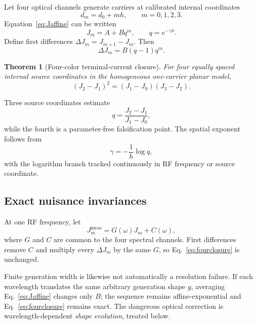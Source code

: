 \documentclass[11pt]{article}
\newtheorem{theorem}{Theorem}
\begin{document}
Let four optical channels generate carriers at calibrated internal coordinates
\begin{equation}
d_m=d_0+mh,
\qquad m=0,1,2,3.
\label{eq:fourcoords}
\end{equation}
Equation~\eqref{eq:Jaffine} can be written
\begin{equation}
J_m=A+Bq^m,
\qquad q=e^{-\gamma h}.
\label{eq:affineseq}
\end{equation}
Define first differences $\Delta J_m=J_{m+1}-J_m$. Then
\begin{equation}
\Delta J_m=B(q-1)q^m.
\label{eq:firstdiff}
\end{equation}

\begin{theorem}[Four-color terminal-current closure]
For four equally spaced internal source coordinates in the homogeneous one-carrier planar model,
\begin{equation}
\boxed{(J_2-J_1)^2=(J_1-J_0)(J_3-J_2).}
\label{eq:fourclosure}
\end{equation}
\end{theorem}

Three source coordinates estimate
\begin{equation}
\boxed{q=\frac{J_2-J_1}{J_1-J_0},}
\label{eq:qrecover}
\end{equation}
while the fourth is a parameter-free falsification point. The spatial exponent follows from
\begin{equation}
\boxed{\gamma=-\frac{1}{h}\log q,}
\label{eq:grecover}
\end{equation}
with the logarithm branch tracked continuously in RF frequency or source coordinate.

\subsection{Exact nuisance invariances}

At one RF frequency, let
\begin{equation}
J_m^{\mathrm{meas}}=G(\omega)J_m+C(\omega),
\end{equation}
where $G$ and $C$ are common to the four spectral channels. First differences remove $C$ and multiply every $\Delta J_m$ by the same $G$, so Eq.~\eqref{eq:fourclosure} is unchanged.

Finite generation width is likewise not automatically a resolution failure. If each wavelength translates the same arbitrary generation shape $g$, averaging Eq.~\eqref{eq:Jaffine} changes only $B$; the sequence remains affine-exponential and Eq.~\eqref{eq:fourclosure} remains exact. The dangerous optical correction is wavelength-dependent \emph{shape evolution}, treated below.
\end{document}
